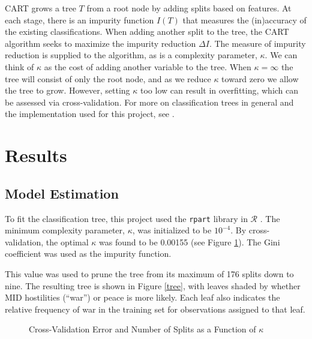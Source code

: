 \documentclass[12pt,letterpaper]{article} %
\begin{document}
CART grows a tree $T$ from a root node by adding splits based on features. At each stage, there is an impurity function $I(T)$ that measures the (in)accuracy of the existing classifications. When adding another split to the tree, the CART algorithm seeks to maximize the impurity reduction $\Delta I$. The measure of impurity reduction is supplied to the algorithm, as is a complexity parameter, $\kappa$. We can think of $\kappa$ as the cost of adding another variable to the tree. When $\kappa=\infty$ the tree will consist of only the root node, and as we reduce $\kappa$ toward zero we allow the tree to grow. However, setting $\kappa$ too low can result in overfitting, which can be assessed via cross-validation. For more on classification trees in general and the implementation used for this project, see \citep{murphy2012machine,olshen1984classification,therneau1997introduction}. 



\section{Results}

\subsection{Model Estimation}

To fit the classification tree, this project used the \texttt{rpart} library in $\mathcal{R}$ \citep{therneau1997introduction}. The minimum complexity parameter, $\kappa$, was initialized to be $10^{-4}$. By cross-validation, the optimal $\kappa$ was found to be 0.00155 (see Figure \ref{cpplot}). The Gini coefficient was used as the impurity function. 

This value was used to prune the tree from its maximum of 176 splits down to nine. The resulting tree is shown in Figure \ref{tree}, with leaves shaded by whether MID hostilities (``war'') or peace is more likely. Each leaf also indicates the relative frequency of war in the training set for observations assigned to that leaf.

\begin{figure}
  \begin{center}
    
    \caption{Cross-Validation Error and Number of Splits as a Function of $\kappa$}
    \label{cpplot}
  \end{center}
\end{figure}
\end{document}
